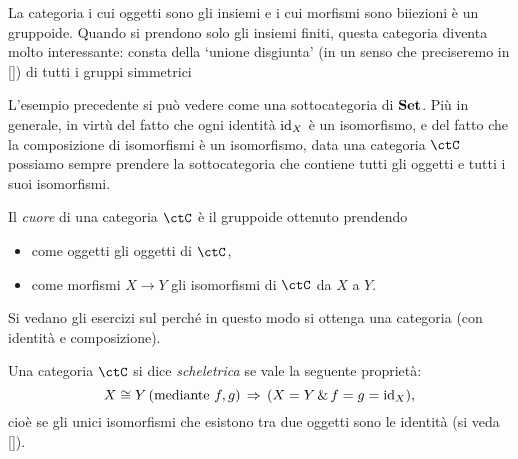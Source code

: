 \begin{example}
 La categoria i cui oggetti sono gli insiemi e i cui morfismi sono biiezioni è un gruppoide. Quando si prendono solo gli insiemi finiti, questa categoria diventa molto interessante: consta della `unione disgiunta' (in un senso che preciseremo in \ref{}) di tutti i gruppi simmetrici\Todo{}
\end{example}

L'esempio precedente si può vedere come una sottocategoria di $\mathbf{Set}$.
Più in generale, in virtù del fatto che ogni identità $\mathrm{id}_X$ è un isomorfismo, e del fatto che la composizione di isomorfismi è un isomorfismo, data una categoria $\ctC$ possiamo sempre prendere la sottocategoria che contiene tutti gli oggetti e tutti i suoi isomorfismi.
\begin{definition}
 Il \emph{cuore} di una categoria $\ctC$ è il gruppoide ottenuto prendendo
 \begin{itemize}
    \item come oggetti gli oggetti di $\ctC$,
    \item come morfismi $X\to Y$ gli isomorfismi di $\ctC$ da $X$ a $Y$.
 \end{itemize}
\end{definition}

Si vedano gli esercizi sul perché in questo modo si ottenga una categoria (con identità e composizione).

\begin{definition}\label{def_cat_scheletrica}
    Una categoria $\ctC$ si dice \emph{scheletrica} se vale la seguente proprietà:
    \[X\cong Y \, (\text{mediante } f,g) \,\Rightarrow\, (X=Y \,\&\, f=g=\mathrm{id}_X),\]
    cioè se gli unici isomorfismi che esistono tra due oggetti sono le identità (si veda \autoref{}).
\end{definition}
